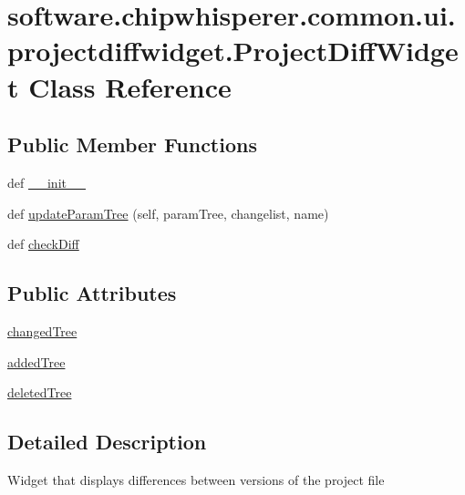 \hypertarget{classsoftware_1_1chipwhisperer_1_1common_1_1ui_1_1projectdiffwidget_1_1ProjectDiffWidget}{}\section{software.\+chipwhisperer.\+common.\+ui.\+projectdiffwidget.\+Project\+Diff\+Widget Class Reference}
\label{classsoftware_1_1chipwhisperer_1_1common_1_1ui_1_1projectdiffwidget_1_1ProjectDiffWidget}
\subsection*{Public Member Functions}
\begin{DoxyCompactItemize}
\item 
def \hyperlink{classsoftware_1_1chipwhisperer_1_1common_1_1ui_1_1projectdiffwidget_1_1ProjectDiffWidget_a34d1b846d20513185791ceb223a2d7d6}{\+\_\+\+\_\+init\+\_\+\+\_\+}
\item 
def \hyperlink{classsoftware_1_1chipwhisperer_1_1common_1_1ui_1_1projectdiffwidget_1_1ProjectDiffWidget_aaa9e318ed703393e9a7cf89610524818}{update\+Param\+Tree} (self, param\+Tree, changelist, name)
\item 
def \hyperlink{classsoftware_1_1chipwhisperer_1_1common_1_1ui_1_1projectdiffwidget_1_1ProjectDiffWidget_aa32275c546269f859ccbb4c598788751}{check\+Diff}
\end{DoxyCompactItemize}
\subsection*{Public Attributes}
\begin{DoxyCompactItemize}
\item 
\hyperlink{classsoftware_1_1chipwhisperer_1_1common_1_1ui_1_1projectdiffwidget_1_1ProjectDiffWidget_ab6906fd3d24048adb62e9717c03c1cfd}{changed\+Tree}
\item 
\hyperlink{classsoftware_1_1chipwhisperer_1_1common_1_1ui_1_1projectdiffwidget_1_1ProjectDiffWidget_a981829a4f4467881576965caaa4e32b1}{added\+Tree}
\item 
\hyperlink{classsoftware_1_1chipwhisperer_1_1common_1_1ui_1_1projectdiffwidget_1_1ProjectDiffWidget_a22c6825aa183df4fa6337d977eb5e9bd}{deleted\+Tree}
\end{DoxyCompactItemize}


\subsection{Detailed Description}
\begin{DoxyVerb}Widget that displays differences between versions of the project file\end{DoxyVerb}
 

